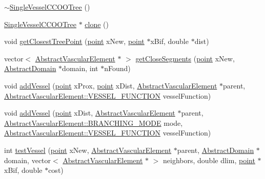 \begin{DoxyCompactItemize}
\item 
\hyperlink{class_single_vessel_c_c_o_o_tree_a1c137ac564fb37adef0830032e68e0e0}{$\sim$\+Single\+Vessel\+C\+C\+O\+O\+Tree} ()
\item 
\hyperlink{class_single_vessel_c_c_o_o_tree}{Single\+Vessel\+C\+C\+O\+O\+Tree} $\ast$ \hyperlink{class_single_vessel_c_c_o_o_tree_acff17f1c7f1c69539d94f86e0ffbe267}{clone} ()
\item 
void \hyperlink{class_single_vessel_c_c_o_o_tree_aac665cdb3fa0687f579ef844ac47c5a7}{get\+Closest\+Tree\+Point} (\hyperlink{structpoint}{point} x\+New, \hyperlink{structpoint}{point} $\ast$x\+Bif, double $\ast$dist)
\item 
vector$<$ \hyperlink{class_abstract_vascular_element}{Abstract\+Vascular\+Element} $\ast$ $>$ \hyperlink{class_single_vessel_c_c_o_o_tree_a2c33f20925efececc655c7b8d89c93ed}{get\+Close\+Segments} (\hyperlink{structpoint}{point} x\+New, \hyperlink{class_abstract_domain}{Abstract\+Domain} $\ast$domain, int $\ast$n\+Found)
\item 
void \hyperlink{class_single_vessel_c_c_o_o_tree_ae9f08ba67c5a9a13b17313c9e86ccaa8}{add\+Vessel} (\hyperlink{structpoint}{point} x\+Prox, \hyperlink{structpoint}{point} x\+Dist, \hyperlink{class_abstract_vascular_element}{Abstract\+Vascular\+Element} $\ast$parent, \hyperlink{class_abstract_vascular_element_a7d7b7863aae4952ba79a590ee65702ec}{Abstract\+Vascular\+Element\+::\+V\+E\+S\+S\+E\+L\+\_\+\+F\+U\+N\+C\+T\+I\+ON} vessel\+Function)
\item 
void \hyperlink{class_single_vessel_c_c_o_o_tree_acfd89cea5deab3b413e828b4bc5bdf86}{add\+Vessel} (\hyperlink{structpoint}{point} x\+Dist, \hyperlink{class_abstract_vascular_element}{Abstract\+Vascular\+Element} $\ast$parent, \hyperlink{class_abstract_vascular_element_a2f7b3a097b944cd0b056fee00b93c860}{Abstract\+Vascular\+Element\+::\+B\+R\+A\+N\+C\+H\+I\+N\+G\+\_\+\+M\+O\+DE} mode, \hyperlink{class_abstract_vascular_element_a7d7b7863aae4952ba79a590ee65702ec}{Abstract\+Vascular\+Element\+::\+V\+E\+S\+S\+E\+L\+\_\+\+F\+U\+N\+C\+T\+I\+ON} vessel\+Function)
\item 
int \hyperlink{class_single_vessel_c_c_o_o_tree_a4efc4561ed2de4d186b16d5b3c006fc2}{test\+Vessel} (\hyperlink{structpoint}{point} x\+New, \hyperlink{class_abstract_vascular_element}{Abstract\+Vascular\+Element} $\ast$parent, \hyperlink{class_abstract_domain}{Abstract\+Domain} $\ast$domain, vector$<$ \hyperlink{class_abstract_vascular_element}{Abstract\+Vascular\+Element} $\ast$ $>$ neighbors, double dlim, \hyperlink{structpoint}{point} $\ast$x\+Bif, double $\ast$cost)

\end{DoxyCompactItemize}
